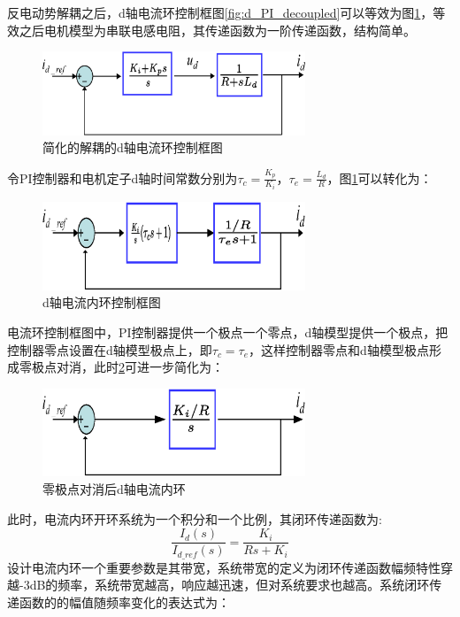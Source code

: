 反电动势解耦之后，d轴电流环控制框图\ref{fig:d_PI_decoupled}可以等效为图\ref{fig:d_PI_decoupled_simple}，等效之后电机模型为串联电感电阻，其传递函数为一阶传递函数，结构简单。
\begin{figure}[H]
	\centering
	\includegraphics[width=0.7\textwidth]{figs/d_PI_decoupled_simple.eps}
	\caption{简化的解耦的d轴电流环控制框图}
	\label{fig:d_PI_decoupled_simple}
\end{figure}
令PI控制器和电机定子d轴时间常数分别为$\tau_{c}=\frac{K_{p}}{K_{i}}$，$\tau_{e}=\frac{L_{d}}{R}$，图\ref{fig:d_PI_decoupled_simple}可以转化为：
\begin{figure}[H]
	\centering
	\includegraphics[width=0.7\textwidth]{figs/d_PI_time_const_format.eps}
	\caption{d轴电流内环控制框图}
	\label{fig:d_PI_time_const_format}
\end{figure}
电流环控制框图中，PI控制器提供一个极点一个零点，d轴模型提供一个极点，把控制器零点设置在d轴模型极点上，即$\tau_{c}=\tau_{e}$，这样控制器零点和d轴模型极点形成零极点对消，此时\ref{fig:d_PI_time_const_format}可进一步简化为：
\begin{figure}[H]
	\centering
	\includegraphics[width=0.7\textwidth]{figs/d_PI_simplest.eps}
	\caption{零极点对消后d轴电流内环}
	\label{fig:d_PI_simplest}
\end{figure}
此时，电流内环开环系统为一个积分和一个比例，其闭环传递函数为:
\begin{equation}
\frac{I_{d}(s)}{I_{d\_ref}(s)}=\frac{K_{i}}{Rs+K_{i}}
\end{equation}
设计电流内环一个重要参数是其带宽，系统带宽的定义为闭环传递函数幅频特性穿越-3dB的频率，系统带宽越高，响应越迅速，但对系统要求也越高\cite{control_theory}。系统闭环传递函数的的幅值随频率变化的表达式为：
